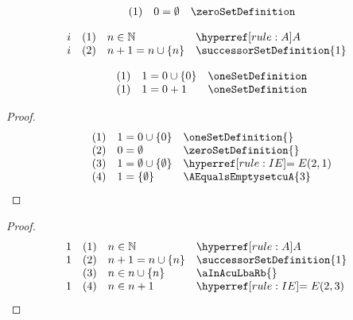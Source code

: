 \documentclass[main.tex]{subfiles}
\begin{document}
\[
\begin{array}{llll}
	& (1) & 0 = \emptyset & \zeroSetDefinition \\
\end{array}
\]

\[
\begin{array}{llll}
	i & (1) & n \in \mathbb{N} & \rA \\
	i & (2) & n + 1 = n \cup \{n\} & \successorSetDefinition{1} \\
\end{array}
\]

\[
\begin{array}{llll}
	& (1) & 1 = 0 \cup \{0\} & \oneSetDefinition \\
 	& (1) & 1 = 0+1 & \oneSetDefinition \\
\end{array}
\]


\label{OneEqualsLbEmptysetRb}
\begin{theorem}[\(1=\{\emptyset\}\)]
\end{theorem}
\begin{proof}
	\[
	\begin{array}{llll}
		      & (1) & 1=0\cup\{0\} & \oneSetDefinition{}\\
		    & (2) & 0=\emptyset  & \zeroSetDefinition{}\\
		    & (3) & 1=\emptyset\cup\{\emptyset\} & \rIE{2,1} \\		
            & (4) & 1=\{\emptyset\} & \AEqualsEmptysetcuA{3} \\		
	\end{array}
	\]
\end{proof}

\label{nInNaturalImpnInnPlusOne}
\begin{theorem}
\end{theorem}
\begin{proof}
	\[
	\begin{array}{llll}
		  1   & (1) & n\in\mathbb{N} & \rA\\
		1   & (2) & n+1=n\cup\{n\}  & \successorSetDefinition{1}\\
            & (3) & n\in n\cup\{n\}  & \aInAcuLbaRb{}\\
        1   & (4) & n\in n+1  & \rIE{2,3}
	\end{array}
	\]
\end{proof}
\end{document}
